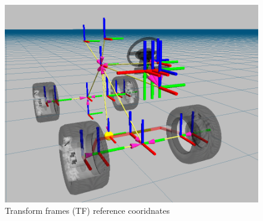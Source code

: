 \begin{figure}[ht]
	\begin{minipage}[b]{1\linewidth}
	    \centering
	    \includegraphics[width=\textwidth]{modelo_carina/carina_tf_wheels_transp.png}
	 	\caption{Transform frames (TF) reference cooridnates}
	 	\label{fig:tf}
	\end{minipage}
\end{figure}




